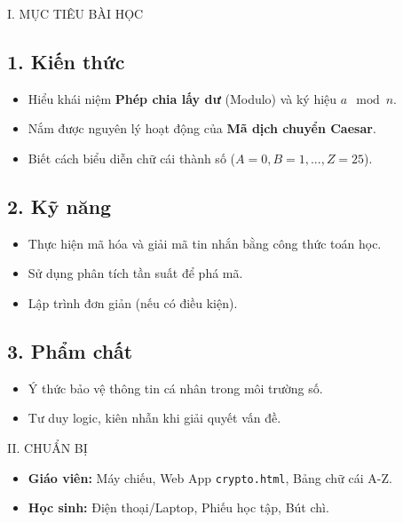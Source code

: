 \documentclass[12pt,a4paper]{article}
\begin{document}
\begin{sectionbox}{I. MỤC TIÊU BÀI HỌC}
\subsection*{1. Kiến thức}
\begin{itemize}
    \item Hiểu khái niệm \textbf{Phép chia lấy dư} (Modulo) và ký hiệu $a \mod n$.
    \item Nắm được nguyên lý hoạt động của \textbf{Mã dịch chuyển Caesar}.
    \item Biết cách biểu diễn chữ cái thành số ($A=0, B=1, ..., Z=25$).
\end{itemize}

\subsection*{2. Kỹ năng}
\begin{itemize}
    \item Thực hiện mã hóa và giải mã tin nhắn bằng công thức toán học.
    \item Sử dụng phân tích tần suất để phá mã.
    \item Lập trình đơn giản (nếu có điều kiện).
\end{itemize}

\subsection*{3. Phẩm chất}
\begin{itemize}
    \item Ý thức bảo vệ thông tin cá nhân trong môi trường số.
    \item Tư duy logic, kiên nhẫn khi giải quyết vấn đề.
\end{itemize}
\end{sectionbox}

\begin{sectionbox}{II. CHUẨN BỊ}
\begin{itemize}
    \item \textbf{Giáo viên:} Máy chiếu, Web App \texttt{crypto.html}, Bảng chữ cái A-Z.
    \item \textbf{Học sinh:} Điện thoại/Laptop, Phiếu học tập, Bút chì.
\end{itemize}
\end{sectionbox}
\end{document}
